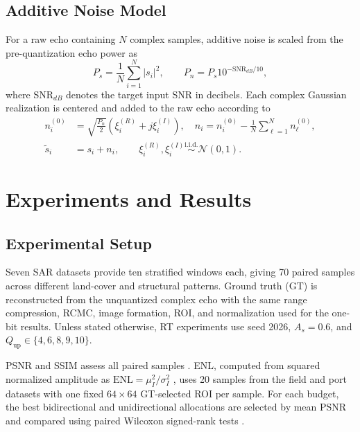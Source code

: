 \documentclass[conference]{IEEEtran}
\begin{document}
\subsection{Additive Noise Model}

For a raw echo containing $N$ complex samples, additive noise is scaled from the pre-quantization echo power as
\begin{equation}
    P_s=\frac{1}{N}\sum_{i=1}^{N}|s_i|^2,\qquad
    P_n=P_s10^{-\mathrm{SNR}_{dB}/10},
\end{equation}
where SNR$_{dB}$ denotes the target input SNR in decibels. Each complex Gaussian realization is centered and added to the raw echo according to
\begin{equation}
    \begin{aligned}
        n_i^{(0)}&=\sqrt{\frac{P_n}{2}}\left(\xi_i^{(R)}+j\xi_i^{(I)}\right),\quad
        n_i=n_i^{(0)}-\frac{1}{N}\sum_{\ell=1}^{N}n_\ell^{(0)},\\
        \widetilde{s}_i&=s_i+n_i,\qquad
        \xi_i^{(R)},\xi_i^{(I)}\overset{\mathrm{i.i.d.}}{\sim}\mathcal{N}(0,1).
    \end{aligned}
\end{equation}

\section{Experiments and Results}

\subsection{Experimental Setup}

Seven SAR datasets provide ten stratified windows each, giving 70 paired samples across different land-cover and structural patterns. Ground truth (GT) is reconstructed from the unquantized complex echo with the same range compression, RCMC, image formation, ROI, and normalization used for the one-bit results. Unless stated otherwise, RT experiments use seed 2026, $A_s=0.6$, and $Q_{\mathrm{up}}\in\{4,6,8,9,10\}$.

PSNR and SSIM assess all paired samples \cite{wang2004ssim}. ENL, computed from squared normalized amplitude as $\mathrm{ENL}=\mu_I^2/\sigma_I^2$ \cite{feng2015tgv}, uses 20 samples from the field and port datasets with one fixed $64\times64$ GT-selected ROI per sample. For each budget, the best bidirectional and unidirectional allocations are selected by mean PSNR and compared using paired Wilcoxon signed-rank tests \cite{wilcoxon1945ranking}.
\end{document}
